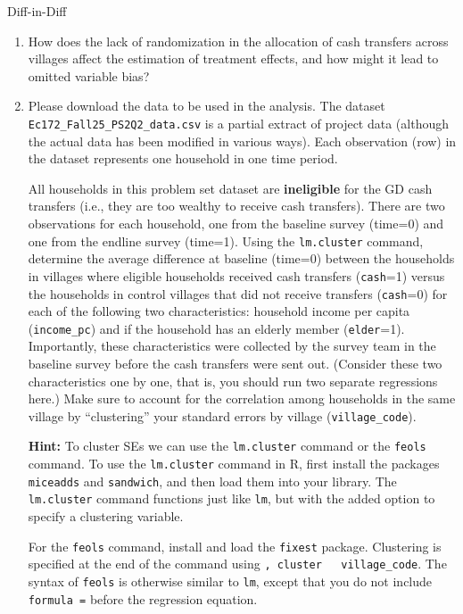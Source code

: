 \begin{homeworkProblem}{Diff-in-Diff}
\begin{enumerate}
        \item How does the lack of randomization in the allocation of cash 
            transfers across villages affect the estimation of treatment 
            effects, and how might it lead to omitted variable bias?

        \item Please download the data to be used in the analysis. The 
            dataset \texttt{Ec172\_Fall25\_PS2Q2\_data.csv} is a partial 
            extract of project data (although the actual data has been 
            modified in various ways). Each observation (row) in the dataset 
            represents one household in one time period.

        All households in this problem set dataset are 
        \textbf{ineligible} for the GD cash transfers (i.e., they are 
        too wealthy to receive cash transfers). There are two 
        observations for each household, one from the baseline survey 
        (time=0) and one from the endline survey (time=1). Using the 
        \texttt{lm.cluster} command, determine the average difference at 
        baseline (time=0) between the households in villages where 
        eligible households received cash transfers (\texttt{cash}=1) 
        versus the households in control villages that did not receive 
        transfers (\texttt{cash}=0) for each of the following two 
        characteristics: household income per capita 
        (\texttt{income\_pc}) and if the household has an elderly member 
        (\texttt{elder}=1). Importantly, these characteristics were 
        collected by the survey team in the baseline survey before the 
        cash transfers were sent out. (Consider these two 
        characteristics one by one, that is, you should run two separate 
        regressions here.) Make sure to account for the correlation 
        among households in the same village by ``clustering'' your 
        standard errors by village (\texttt{village\_code}).

        \textbf{Hint:} To cluster SEs we can use the 
        \texttt{lm.cluster} command or the \texttt{feols} command. To use 
        the \texttt{lm.cluster} command in R, first install the packages 
        \texttt{miceadds} and \texttt{sandwich}, and then load them into 
        your library. The \texttt{lm.cluster} command functions just like 
        \texttt{lm}, but with the added option to specify a clustering 
        variable.

        For the \texttt{feols} command, install and load the 
        \texttt{fixest} package. Clustering is specified at the end of 
        the command using \texttt{, cluster ~ village\_code}. The syntax 
        of \texttt{feols} is otherwise similar to \texttt{lm}, except 
        that you do not include \texttt{formula =} before the regression 
        equation.


\end{enumerate}
\end{homeworkProblem}
